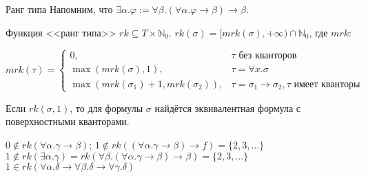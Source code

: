 \documentclass[aspectratio=169]{beamer}
\begin{document}
\begin{frame}{Ранг типа}
Напомним, что $\exists\alpha.\varphi := \forall \beta.(\forall\alpha.\varphi\rightarrow\beta)\rightarrow\beta$.
\begin{dfn}Функция <<ранг типа>> $rk \subseteq T \times \mathbb{N}_0$. $rk(\sigma) = [mrk(\sigma),+\infty)\cap\mathbb{N}_0$, где $mrk$:

$$mrk(\tau)=\left\{\begin{array}{ll}
0, &\tau \text{ без кванторов}\\
\max(mrk(\sigma),1), &\tau = \forall x.\sigma\\
\max(mrk(\sigma_1)+1,mrk(\sigma_2)), & \tau = \sigma_1\rightarrow\sigma_2, \tau\text{ имеет кванторы}
\end{array}\right.
$$
\end{dfn}\vspace{-0.5cm}

\begin{lmm}
Если $rk(\sigma,1)$, то для формулы $\sigma$ найдётся эквивалентная формула с поверхностными кванторами.
\end{lmm}

\begin{exm}
$0 \notin rk(\forall\alpha.\gamma\rightarrow\beta)$; $1 \notin rk((\forall\alpha.\gamma\rightarrow\beta)\rightarrow f)=\{2,3,\dots\}$\\
$1 \notin rk(\exists\alpha.\gamma) = rk(\forall\beta.(\forall\alpha.\gamma\rightarrow\beta)\rightarrow\beta) = \{2,3,\dots\}$\\
$1 \in rk(\forall\alpha.\delta\rightarrow\forall\beta.\delta\rightarrow\forall\gamma.\delta)$
\end{exm}

\end{frame}
\end{document}
